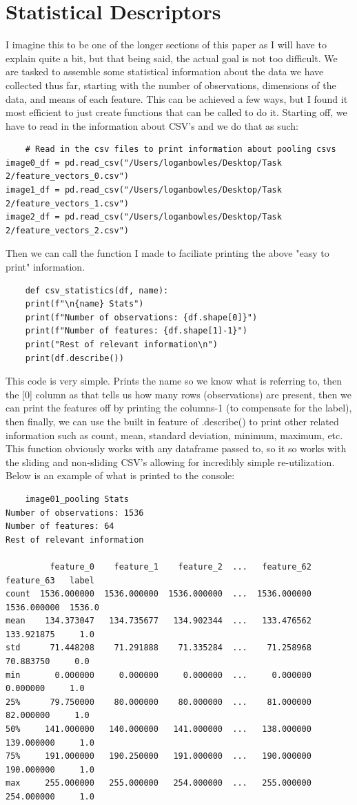 \documentclass[conference]{IEEEtran} %
\begin{document}
\section{Statistical Descriptors}
I imagine this to be one of the longer sections of this paper as I will have to explain quite a bit, but that being said, the actual goal is not too difficult.  We are tasked to assemble some statistical information about the data we have collected thus far, starting with the number of observations, dimensions of the data, and means of each feature.  This can be achieved a few ways, but I found it most efficient to just create functions that can be called to do it.  Starting off, we have to read in the information about CSV's and we do that as such:
\begin{lstlisting}
    # Read in the csv files to print information about pooling csvs
image0_df = pd.read_csv("/Users/loganbowles/Desktop/Task 2/feature_vectors_0.csv")
image1_df = pd.read_csv("/Users/loganbowles/Desktop/Task 2/feature_vectors_1.csv")
image2_df = pd.read_csv("/Users/loganbowles/Desktop/Task 2/feature_vectors_2.csv")
\end{lstlisting}
Then we can call the function I made to faciliate printing the above "easy to print" information.
\begin{lstlisting}
    def csv_statistics(df, name):
    print(f"\n{name} Stats")
    print(f"Number of observations: {df.shape[0]}")
    print(f"Number of features: {df.shape[1]-1}")
    print("Rest of relevant information\n")
    print(df.describe())
\end{lstlisting}
This code is very simple.  Prints the name so we know what is referring to, then the [0] column as that tells us how many rows (observations) are present, then we can print the features off by printing the columns-1 (to compensate for the label), then finally, we can use the built in feature of .describe() to print other related information such as count, mean, standard deviation, minimum, maximum, etc.  This function obviously works with any dataframe passed to, so it so works with the sliding and non-sliding CSV's allowing for incredibly simple re-utilization.  Below is an example of what is printed to the console:
\begin{lstlisting}
    image01_pooling Stats
Number of observations: 1536
Number of features: 64
Rest of relevant information

         feature_0    feature_1    feature_2  ...   feature_62   feature_63   label
count  1536.000000  1536.000000  1536.000000  ...  1536.000000  1536.000000  1536.0
mean    134.373047   134.735677   134.902344  ...   133.476562   133.921875     1.0
std      71.448208    71.291888    71.335284  ...    71.258968    70.883750     0.0
min       0.000000     0.000000     0.000000  ...     0.000000     0.000000     1.0
25%      79.750000    80.000000    80.000000  ...    81.000000    82.000000     1.0
50%     141.000000   140.000000   141.000000  ...   138.000000   139.000000     1.0
75%     191.000000   190.250000   191.000000  ...   190.000000   190.000000     1.0
max     255.000000   255.000000   254.000000  ...   255.000000   254.000000     1.0
\end{lstlisting}
\end{document}

